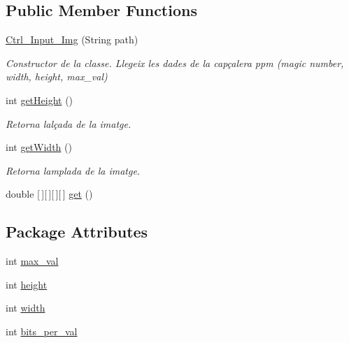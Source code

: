 \subsection*{Public Member Functions}
\begin{DoxyCompactItemize}
\item 
\hyperlink{classpersistencia_1_1input_1_1Ctrl__Input__Img_a79318a62df31dfd107554e92e29f6d9a}{Ctrl\+\_\+\+Input\+\_\+\+Img} (String path)
\begin{DoxyCompactList}\small\item\em Constructor de la classe. Llegeix les dades de la capçalera ppm (magic number, width, height, max\+\_\+val) \end{DoxyCompactList}\item 
int \hyperlink{classpersistencia_1_1input_1_1Ctrl__Input__Img_a55dc2906950235559f83b4765aea73e8}{get\+Height} ()
\begin{DoxyCompactList}\small\item\em Retorna l\textquotesingle{}alçada de la imatge. \end{DoxyCompactList}\item 
int \hyperlink{classpersistencia_1_1input_1_1Ctrl__Input__Img_ab4cda237a52c99efb4411e0e86f3d3a2}{get\+Width} ()
\begin{DoxyCompactList}\small\item\em Retorna l\textquotesingle{}amplada de la imatge. \end{DoxyCompactList}\item 
double \mbox{[}$\,$\mbox{]}\mbox{[}$\,$\mbox{]}\mbox{[}$\,$\mbox{]}\mbox{[}$\,$\mbox{]} \hyperlink{classpersistencia_1_1input_1_1Ctrl__Input__Img_ac549527b5947a7ec9f40d53e492f4ffa}{get} ()
\end{DoxyCompactItemize}
\subsection*{Package Attributes}
\begin{DoxyCompactItemize}
\item 
int \hyperlink{classpersistencia_1_1input_1_1Ctrl__Input__Img_a1b8fa2d000a1d5d873be62d1f609e4be}{max\+\_\+val}
\item 
int \hyperlink{classpersistencia_1_1input_1_1Ctrl__Input__Img_abc1dcc48714e9e74fb8ae0e0b81f91bf}{height}
\item 
int \hyperlink{classpersistencia_1_1input_1_1Ctrl__Input__Img_a51dd0b9243b854aa25ac4532acca4524}{width}
\item 
int \hyperlink{classpersistencia_1_1input_1_1Ctrl__Input__Img_a222ad0e7d241e5f396cf67c3b760f143}{bits\+\_\+per\+\_\+val}
\end{DoxyCompactItemize}

